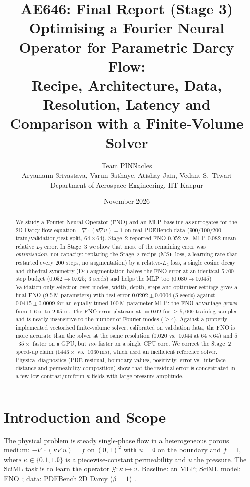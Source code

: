 \documentclass[11pt,a4paper]{article}
\title{\textbf{AE646: Final Report (Stage 3)}\\[0.4em]
\large Optimising a Fourier Neural Operator for Parametric Darcy Flow:\\
Recipe, Architecture, Data, Resolution, Latency and Comparison with a Finite-Volume Solver}
\author{Team PINNacles\\Aryamann Srivastava, Varun Sathaye, Atishay Jain, Vedant S.\ Tiwari\\Department of Aerospace Engineering, IIT Kanpur}
\date{November 2026}
\begin{document}
\maketitle

\begin{abstract}
We study a Fourier Neural Operator (FNO) and an MLP baseline as surrogates for the 2D Darcy flow equation $-\nabla\!\cdot(\kappa\nabla u)=1$ on real PDEBench data (900/100/200 train/validation/test split, $64\times64$). Stage~2 reported FNO $0.052$ vs.\ MLP $0.082$ mean relative $L_2$ error. In Stage~3 we show that most of the remaining error was \emph{optimisation}, not capacity: replacing the Stage~2 recipe (MSE loss, a learning rate that restarted every 200 steps, no augmentation) by a relative-$L_2$ loss, a single cosine decay and dihedral-symmetry (D4) augmentation halves the FNO error at an identical 5\,700-step budget ($0.052\to0.025$; 3 seeds) and helps the MLP too ($0.080\to0.045$). Validation-only selection over modes, width, depth, steps and optimiser settings gives a final FNO (9.5\,M parameters) with test error $0.0202\pm0.0004$ (5 seeds) against $0.0415\pm0.0009$ for an equally tuned 100\,M-parameter MLP: the FNO advantage \emph{grows} from $1.6\times$ to $2.05\times$. The FNO error plateaus at $\approx0.02$ for $\ge 5{,}000$ training samples and is nearly insensitive to the number of Fourier modes ($\ge 4$). Against a properly implemented vectorised finite-volume solver, calibrated on validation data, the FNO is more accurate than the solver at the same resolution ($0.020$ vs.\ $0.044$ at $64\times64$) and $5$--$35\times$ faster on a GPU, but \emph{not} faster on a single CPU core. We correct the Stage~2 speed-up claim ($1443\times$ vs.\ 1030\,ms), which used an inefficient reference solver. Physical diagnostics (PDE residual, boundary values, positivity, error vs.\ interface distance and permeability composition) show that the residual error is concentrated in a few low-contrast/uniform-$\kappa$ fields with large pressure amplitude.
\end{abstract}

\section{Introduction and Scope}
The physical problem is steady single-phase flow in a heterogeneous porous medium: $-\nabla\!\cdot(\kappa\nabla u)=f$ on $(0,1)^2$ with $u=0$ on the boundary and $f=1$, where $\kappa\in\{0.1,1.0\}$ is a piecewise-constant permeability and $u$ the pressure. The SciML task is to learn the operator $\mathcal G:\kappa\mapsto u$. Baseline: an MLP; SciML model: FNO~\cite{li2021fno}; data: PDEBench 2D Darcy ($\beta=1$)~\cite{takamoto2022pdebench}.
\end{document}
